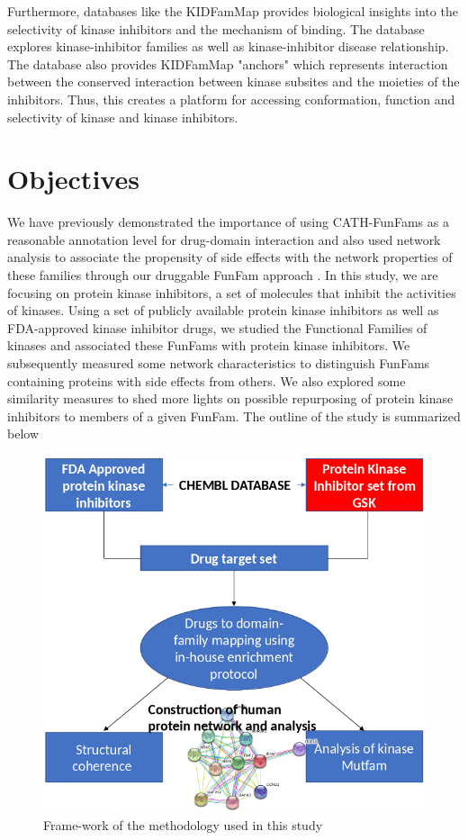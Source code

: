 \documentclass[a4paper, 11pt]{article}
\newcommand{\redcomment}[1]{\textcolor{red}{[#1]}} %
\begin{document}
Furthermore, databases like the KIDFamMap \cite{chiu2012kidfammap} provides biological insights into the selectivity of kinase inhibitors and the mechanism of binding. The database explores kinase-inhibitor families as well as kinase-inhibitor disease relationship. The database also provides KIDFamMap "anchors" which represents interaction between the conserved interaction between kinase subsites and the moieties of the inhibitors. Thus, this creates a platform for accessing conformation, function and selectivity of kinase and kinase inhibitors. 

\newpage
\section*{Objectives}
We have previously demonstrated the importance of using CATH-FunFams as a reasonable annotation level for drug-domain interaction and also used network analysis to associate the propensity of side effects with the network properties of these families through our druggable FunFam approach \cite{moya2017structural}. In this study, we are focusing on protein kinase inhibitors, a set of molecules that inhibit the activities of kinases. Using a set of publicly available protein kinase inhibitors as well as FDA-approved kinase inhibitor drugs, we studied the Functional Families of kinases and associated these FunFams with protein kinase inhibitors. We subsequently measured some network characteristics to distinguish FunFams containing proteins with side effects from others. We also explored some similarity measures to shed more lights on possible repurposing of protein kinase inhibitors to members of a given FunFam.
The outline of the study is summarized below\par
\begin{figure}[H]
	\includegraphics[width=.8\linewidth]{figures/framework.png}
	\centering
	\caption{Frame-work of the methodology used in this study}
	\label{framework}
\end{figure}
\end{document}
